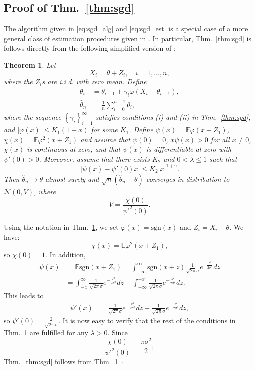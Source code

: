 \documentclass[letterpaper, conference]{IEEEtran}      %
\newtheorem{thm}{\bf{Theorem}}
\newcommand{\sgn}{\mathrm{sgn} }
\newcommand*{\QEDA}{\hfill\ensuremath{\square}}
\begin{document}
\subsection*{Proof of Thm.~\ref{thm:sgd}}
The algorithm given in \eqref{eq:sgd_alg} and \eqref{eq:sgd_est} is a special case of a more general class of estimation procedures given in \cite{polyak1992acceleration}. In particular, Thm.~\ref{thm:sgd} is follows directly from the following simplified version of \cite[Thm. 4]{polyak1992acceleration}:
\begin{thm}{\cite[Thm. 4]{polyak1992acceleration}} \label{thm:polyak_juditsky}
Let 
\[
X_i = \theta + Z_i,\quad i=1,\ldots,n,
\]
where the $Z_i$s are i.i.d. with zero mean. Define 
\begin{align*}
\theta_i & = \theta_{i-1} + \gamma_i \varphi(X_i - \theta_{i-1}), \\
\widehat{\theta}_n & = \frac{1}{n} \sum_{i=0}^{n-1} \theta_i,
\end{align*}
where the sequence $\left\{ \gamma_i \right\}_{i=1}^\infty$ satisfies conditions (i) and (ii) in Thm.~\ref{thm:sgd}, and $\left| \varphi(x) \right| \leq K_1(1+x)$ for some $K_1$. Define $\psi(x) = \mathbb E \varphi(x+Z_1)$, $\chi(x) = \mathbb E \varphi^2(x+Z_1)$ and assume that $\psi(0)=0$, $x\psi(x) >0$ for all $x\neq 0$, $\chi(x)$ is continuous at zero, and that $\psi(x)$ is differentiable at zero with $\psi'(0)>0$. Moreover, assume that there exists $K_2$ and $0<\lambda \leq 1$ such that
\[
\left| \psi(x) - \psi'(0)x \right|\leq K_2 |x|^{1+\gamma}.
\]
Then $\widehat{\theta}_n \rightarrow \theta$ almost surely and $ \sqrt{n}(\widehat{\theta}_n - \theta)$ converges in distribution to $\mathcal N(0,V)$, where
\[
V = \frac{ \chi(0)} {\psi'^2(0)}. 
\]
\end{thm}


Using the notation in Thm.~\ref{thm:polyak_juditsky}, we set $\varphi(x) = \sgn(x)$ and $Z_i = X_i - \theta$. We have: 
\[
\chi(x) = \mathbb E \varphi^2(x+Z_1),
\]
so $\chi(0) = 1$. In addition,
\begin{align*}
\psi(x) & = \mathbb E \sgn(x+ Z_1) = \int_{-\infty}^\infty \sgn(x+z) \frac{1}{\sqrt{2\pi}\sigma} e^{-\frac{z^2}{2\sigma^2}} dz \\
& = \int_{-x}^\infty \frac{1}{\sqrt{2\pi}\sigma} e^{-\frac{z^2}{2\sigma^2}} dz -\int_{-\infty}^{-x} \frac{1}{\sqrt{2\pi}\sigma} e^{-\frac{z^2}{2\sigma^2}} dz.
\end{align*}
This leads to 
\begin{align*}
\psi'(x) & = \frac{1}{\sqrt{2\pi}\sigma} e^{-\frac{x^2}{2\sigma^2}} dz +\frac{1}{\sqrt{2\pi}\sigma} e^{-\frac{z^2}{2\sigma^2}} dz,
\end{align*}
so $\psi'(0) = \frac{2}{\sqrt{2\pi}\sigma}$. It is now easy to verify that the rest of the conditions in Thm.~\ref{thm:polyak_juditsky} are fulfilled for any $\lambda > 0$. Since 
\[
\frac{\chi(0)}{\psi'^2(0)} = \frac{\pi \sigma^2}{2},
\]
Thm.~\ref{thm:sgd} follows from Thm.~\ref{thm:polyak_juditsky}. \QEDA
\end{document}
